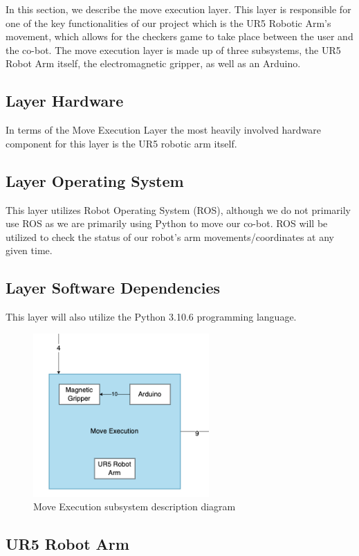 In this section, we describe the move execution layer. This layer is responsible for one of the key functionalities of our project which is the UR5 Robotic Arm's movement, which allows for the checkers game to take place between the user and the co-bot. The move execution layer is made up of three subsystems, the UR5 Robot Arm itself, the electromagnetic gripper, as well as an Arduino.

\subsection{Layer Hardware}
In terms of the Move Execution Layer the most heavily involved hardware component for this layer is the UR5 robotic arm itself. 

\subsection{Layer Operating System}
This layer utilizes Robot Operating System (ROS), although we do not primarily use ROS as we are primarily using Python to move our co-bot. ROS will be utilized to check the status of our robot's arm movements/coordinates at any given time.

\subsection{Layer Software Dependencies}
This layer will also utilize the Python 3.10.6 programming language. 

\begin{figure}[h!]
	\centering
 	\includegraphics[width=0.60\textwidth]{images/move_execution.png}
 \caption{Move Execution subsystem description diagram}
\end{figure}

\subsection{UR5 Robot Arm}


